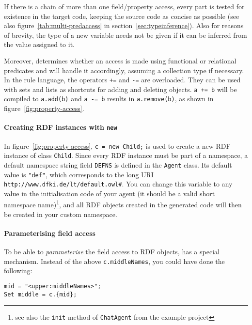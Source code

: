 If there is a chain of more than one field/property access, every part is
tested for existence in the target code, keeping the source code as concise as
possible (see also figure~\ref{tab:multi-predaccess} in
section~\ref{sec:typeinference}). Also for reasons of brevity, the type of a
new variable needs not be given if it can be inferred from the value assigned
to it.

Moreover, \vonda determines whether an access is made using functional or
relational predicates and will handle it accordingly, assuming a collection
type if necessary. In the rule language, the operators \texttt{+=} and
\texttt{-=} are overloaded. They can be used with sets and lists as shortcuts
for adding and deleting objects. \texttt{a += b} will be compiled to
\texttt{a.add(b)} and \texttt{a -= b} results in \texttt{a.remove(b)}, as shown
in figure~\ref{fig:property-access}.

\paragraph{Creating RDF instances with
  \texttt{new}}\label{sec:new_rdf}

In figure~\ref{fig:property-access}, \texttt{c = new Child;} is used
to create a new RDF instance of class \texttt{Child}. Since every RDF
instance must be part of a namespace, a default namespace string
field \texttt{DEFNS} is defined in the \texttt{Agent} class. Its
default value is \texttt{"def"}, which corresponds to the long URI
\texttt{http://www.dfki.de/lt/default.owl\#}. You can change this
variable to any value in the initialisation code of your agent (it
should be a valid short namespace name)\footnote{see also the
  \texttt{init} method of \texttt{ChatAgent} from the example project},
and all RDF objects created in the generated \vonda code will then be
created in your custom namespace.

\paragraph{Parameterising field access}\label{sec:field_access_expansion}

To be able to \emph{parameterise} the field access to RDF objects,
\vonda has a special mechanism. Instead of the above
\texttt{c.middleNames}, you could have done the following:

\begin{lstlisting}
mid = "<upper:middleNames>";
Set middle = c.{mid};
\end{lstlisting}

